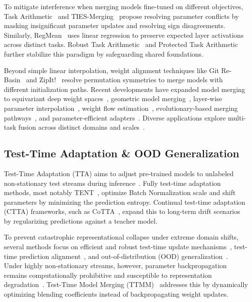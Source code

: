 \documentclass{article}
\theoremstyle{plain}
\theoremstyle{definition}
\theoremstyle{remark}
\begin{document}
To mitigate interference when merging models fine-tuned on different objectives, Task Arithmetic~\cite{Ilharco2023} and TIES-Merging~\cite{Yadav2023, Yadav2023TIESMergingRI} propose resolving parameter conflicts by masking insignificant parameter updates and resolving sign disagreements. Similarly, RegMean~\cite{Jin2023, Nguyen2025RegMeanEE} uses linear regression to preserve expected layer activations across distinct tasks. Robust Task Arithmetic~\cite{Yuan2023RobustTA} and Protected Task Arithmetic~\cite{Bar2024ProtectedTA} further stabilize this paradigm by safeguarding shared foundations.

Beyond simple linear interpolation, weight alignment techniques like Git Re-Basin~\cite{Ainsworth2022GitRM} and ZipIt!~\cite{Stoica2023ZipItMM} resolve permutation symmetries to merge models with different initialization paths. Recent developments have expanded model merging to equivariant deep weight spaces~\cite{Navon2023EquivariantDW}, geometric model merging~\cite{Cao2026GeometricMW}, layer-wise parameter interpolation~\cite{Xiong2025LayerwisePR, Du2025AdaMMSMM}, weight flow estimation~\cite{Gupta2026DeepWeightFlowRF}, evolutionary-based merging pathways~\cite{Akiba2024EvolutionaryOO, Cao2026EvolutionaryNM}, and parameter-efficient adapters~\cite{Chen2023ParameterEfficientFD, Nallabollu2026ParameterEF, Touko2026LightweightTA, Sangamnerkar2025LightweightAD}. Diverse applications explore multi-task fusion across distinct domains and scales~\cite{Crisostomi2026ModelMF, Chaves2025WeightWP, Pala2024DELLAMergingRI, Wang2025InModelMF, Verma2024MergingTT, Kinderman2024FoldableSS, Zhu2024DPPAPM, Ye2025DynamicMM}.

\subsection{Test-Time Adaptation \& OOD Generalization}
Test-Time Adaptation (TTA) aims to adjust pre-trained models to unlabeled non-stationary test streams during inference~\cite{Sun2019TestTimeTF}. Fully test-time adaptation methods, most notably TENT~\cite{Wang2020, Wang2021TentFT}, optimize Batch Normalization scale and shift parameters by minimizing the prediction entropy. Continual test-time adaptation (CTTA) frameworks, such as CoTTA~\cite{Wang2022ContinualTD, Jiang2024PCoTTACT}, expand this to long-term drift scenarios by regularizing predictions against a teacher model.

To prevent catastrophic representational collapse under extreme domain shifts, several methods focus on efficient and robust test-time update mechanisms~\cite{Cheng2025FullyTA, Zhou2025TesttimeTW}, test-time prediction alignment~\cite{You2021TesttimeBS, Peng2025TestTimeAF}, and out-of-distribution (OOD) generalization~\cite{Scalbert2022TesttimeIT, Ouellette2025OutofDistributionGI, Wang2025OutofDistributionGM, Zhou2024OnTE, Zhou2024CrossTaskLE}. Under highly non-stationary streams, however, parameter backpropagation remains computationally prohibitive and susceptible to representation degradation~\cite{Xiong2024TestTimeAW}. Test-Time Model Merging (TTMM)~\cite{Yang2024} addresses this by dynamically optimizing blending coefficients instead of backpropagating weight updates.
\end{document}
